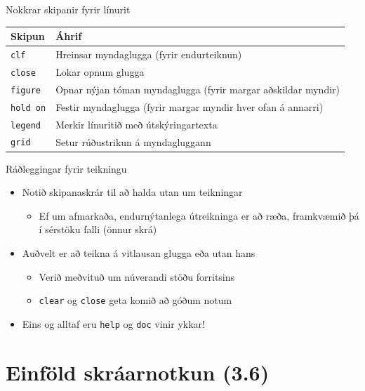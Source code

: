 \documentclass[handout]{beamer}
\begin{document}
\begin{frame}{Nokkrar skipanir fyrir línurit}
\begin{center}
\begin{tabular}{lp{8cm}}
\toprule
Skipun&Áhrif\\
\midrule
\texttt{clf}&Hreinsar myndaglugga (fyrir endurteiknun)\\
\texttt{close}&Lokar opnum glugga\\
\texttt{figure}&Opnar nýjan tóman myndaglugga (fyrir margar aðskildar myndir)\\
\texttt{hold on}&Festir myndaglugga (fyrir margar myndir hver ofan á annarri)\\
\texttt{legend}&Merkir línuritið með útskýringartexta\\
\texttt{grid}&Setur rúðustrikun á myndagluggann\\
\bottomrule
\end{tabular}
\end{center}

\end{frame}

\begin{frame}{Ráðleggingar fyrir teikningu}
\begin{itemize}
 \item Notið skipanaskrár til að halda utan um teikningar
 \begin{itemize}
  \item Ef um afmarkaða, endurnýtanlega útreikninga er að ræða, framkvæmið þá í sérstöku falli (önnur skrá)
 \end{itemize}
 \item Auðvelt er að teikna á vitlausan glugga eða utan hans
 \begin{itemize}
  \item Verið meðvituð um núverandi stöðu forritsins
  \item \texttt{clear} og \texttt{close} geta komið að góðum notum
 \end{itemize}
 \item Eins og alltaf eru \texttt{help} og \texttt{doc} vinir ykkar!
\end{itemize}
\end{frame}

\section{Einföld skráarnotkun (3.6)}
\end{document}
